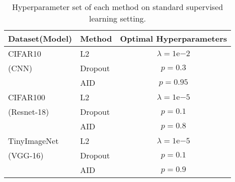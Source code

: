 

\begin{table}[H]
    \centering
    \caption{Hyperparameter set of each method on standard supervised learning setting.}
    \begin{tabular}{l|l|c}
        \toprule
        \textbf{Dataset(Model)} & \textbf{Method} & \textbf{Optimal Hyperparameters} \\
        \midrule
        CIFAR10 &L2     & $\lambda = 1\mathrm{e}{-2}$ \\
        (CNN)
        &Dropout               & $p = 0.3$ \\
        &AID                    & $p=0.95$ \\
        \midrule
        CIFAR100 &L2     & $\lambda = 1\mathrm{e}{-5}$ \\
        (Resnet-18)
        
        &Dropout              & $p = 0.1$ \\
        &AID                  & $p=0.8$ \\
        \midrule
        TinyImageNet &L2 & $\lambda = 1\mathrm{e}{-5}$ \\
        (VGG-16)
        &Dropout            & $p = 0.1$ \\
        &AID               & $p=0.9$ \\
        \bottomrule
    \end{tabular}
    \label{tab:hyperparameter_sl}
\end{table}
\vfill


